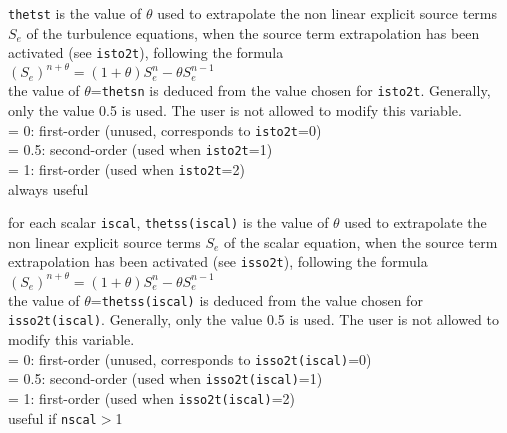 {{\tt thetst} is the value of $\theta$ used to
extrapolate the non linear explicit source terms $S_e$ of the turbulence equations,
when the source term extrapolation has been activated (see {\tt isto2t}),
following the formula\\
$(S_e)^{n+\theta}=(1+\theta)S_e^n-\theta S_e^{n-1}$\\
the value
of $\theta$={\tt thetsn} is deduced from the value chosen for
{\tt isto2t}. Generally, only the value 0.5 is used. The user is not
allowed to modify this variable.\\
\hspace*{1.3cm}= 0: first-order (unused, corresponds to {\tt isto2t}=0) \\
\hspace*{1.3cm}= 0.5: second-order (used when {\tt isto2t}=1) \\
\hspace*{1.3cm}= 1: first-order (used when {\tt isto2t}=2) \\
always useful}

{for each scalar {\tt iscal}, {\tt thetss(iscal)} is the value of $\theta$ used to
extrapolate the non linear explicit source terms $S_e$ of the scalar equation,
when the source term extrapolation has been activated (see {\tt isso2t}),
following the formula\\
$(S_e)^{n+\theta}=(1+\theta)S_e^n-\theta S_e^{n-1}$\\
the value
of $\theta$={\tt thetss(iscal)} is deduced from the value chosen for
{\tt isso2t(iscal)}. Generally, only the value 0.5 is used. The user is not
allowed to modify this variable.\\
\hspace*{1.3cm}= 0: first-order (unused, corresponds to {\tt isso2t(iscal)}=0) \\
\hspace*{1.3cm}= 0.5: second-order (used when {\tt isso2t(iscal)}=1) \\
\hspace*{1.3cm}= 1: first-order (used when {\tt isso2t(iscal)}=2) \\
useful if {\tt nscal}$>$1}



